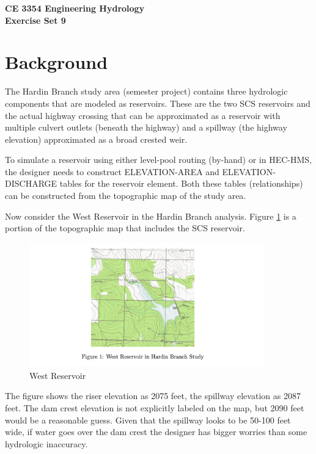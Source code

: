 \documentclass[12pt]{article}
\begin{document}
\begin{center}
{\textbf{{ CE 3354 Engineering Hydrology} \\ {Exercise Set 9}}}
\end{center}

\section*{\small{Background}} 

The Hardin Branch study area (semester project) contains three hydrologic components that are modeled as reservoirs. These are the two SCS reservoirs and the actual highway crossing that can be approximated as a reservoir with multiple culvert outlets (beneath the highway) and a spillway (the highway elevation) approximated as a broad crested weir.

To simulate a reservoir using either level-pool routing (by-hand) or in HEC-HMS, the designer needs to construct ELEVATION-AREA and ELEVATION-DISCHARGE tables for the reservoir element. Both these tables (relationships) can be constructed from the topographic map of the study area.

Now consider the West Reservoir in the Hardin Branch analysis. Figure \ref{fig:fig1} is a portion of the topographic map that includes the SCS reservoir.

\begin{figure}[h!] %
   \centering
   \includegraphics[width=4.0in]{fig1.png} 
   \caption{West Reservoir}
   \label{fig:fig1}
\end{figure}

The figure shows the riser elevation as 2075 feet, the spillway elevation as 2087 feet. The dam crest elevation is not explicitly labeled on the map, but 2090 feet would be a reasonable guess. Given that the spillway looks to be 50-100 feet wide, if water goes over the dam crest the designer has bigger worries than some hydrologic inaccuracy.
\end{document}
